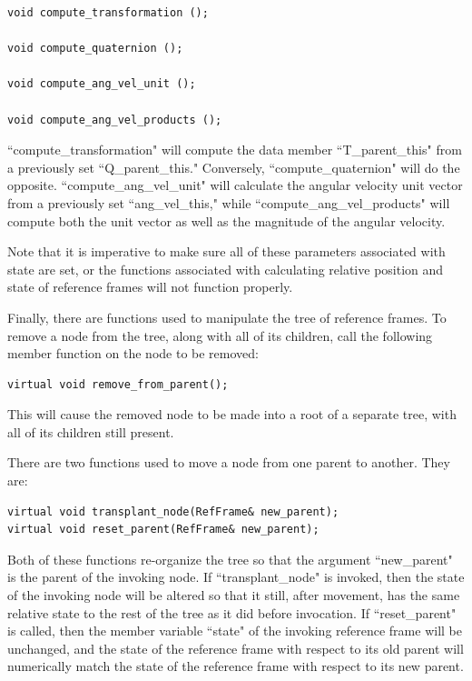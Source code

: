 \begin{verbatim}
void compute_transformation ();

void compute_quaternion ();

void compute_ang_vel_unit ();

void compute_ang_vel_products ();
\end{verbatim}

``compute\_transformation" will compute the data member ``T\_parent\_this" from
a previously set ``Q\_parent\_this." Conversely, ``compute\_quaternion" will do
the opposite. ``compute\_ang\_vel\_unit" will calculate the
angular velocity unit vector from a previously set ``ang\_vel\_this," while
``compute\_ang\_vel\_products" will compute both the unit vector as well
as the magnitude of the angular velocity.

Note that it is imperative to make sure all of these parameters associated with
state are set, or the functions associated with calculating relative position and
state of reference frames will not function properly.

Finally, there are functions used to manipulate the tree of reference frames.
To remove a node from the tree, along with all of its children, call
the following member function on the node to be removed:

\begin{verbatim}
virtual void remove_from_parent();
\end{verbatim}

This will cause the removed node to be made into a root of a separate tree, with
all of its children still present.

There are two functions used to move a node from one parent to another. They are:

\begin{verbatim}
virtual void transplant_node(RefFrame& new_parent);
virtual void reset_parent(RefFrame& new_parent);
\end{verbatim}

Both of these functions re-organize the tree so that the argument
``new\_parent" is the parent of the invoking node. If ``transplant\_node"
is invoked, then the state of the invoking node will be altered so that it
still, after movement, has the same relative state to the rest of the tree
as it did before invocation. If ``reset\_parent" is called, then the
member variable ``state" of the invoking reference frame will be unchanged,
and the state of the reference frame with respect to its old parent will
numerically match the state of the reference frame with respect to its
new parent.

